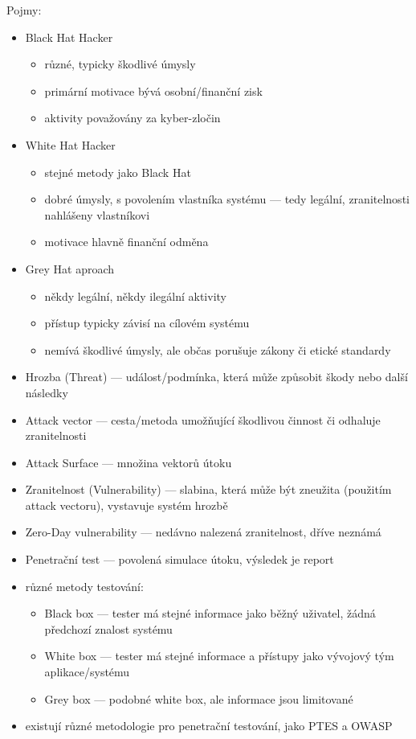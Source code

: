 Pojmy:
\begin{itemize}
	\item Black Hat Hacker
	\begin{itemize}
		\item různé, typicky škodlivé úmysly
		\item primární motivace bývá osobní/finanční zisk
		\item aktivity považovány za kyber-zločin
	\end{itemize}
	\item White Hat Hacker
	\begin{itemize}
		\item stejné metody jako Black Hat
		\item dobré úmysly, s povolením vlastníka systému --- tedy legální, zranitelnosti nahlášeny vlastníkovi
		\item motivace hlavně finanční odměna
	\end{itemize}
	\item Grey Hat aproach
	\begin{itemize}
		\item někdy legální, někdy ilegální aktivity
		\item přístup typicky závisí na cílovém systému
		\item nemívá škodlivé úmysly, ale občas porušuje zákony či etické standardy
	\end{itemize}
	\item Hrozba (Threat) --- událost/podmínka, která může způsobit škody nebo další následky
	\item Attack vector --- cesta/metoda umožňující škodlivou činnost či odhaluje zranitelnosti
	\item Attack Surface --- množina vektorů útoku
	\item Zranitelnost (Vulnerability) --- slabina, která může být zneužita (použitím attack vectoru), vystavuje systém hrozbě
	\item Zero-Day vulnerability --- nedávno nalezená zranitelnost, dříve neznámá
	\item Penetrační test --- povolená simulace útoku, výsledek je report
	\item různé metody testování:
	\begin{itemize}
		\item Black box --- tester má stejné informace jako běžný uživatel, žádná předchozí znalost systému
		\item White box --- tester má stejné informace a přístupy jako vývojový tým aplikace/systému
		\item Grey box --- podobné white box, ale informace jsou limitované
	\end{itemize}
	\item existují různé metodologie pro penetrační testování, jako PTES a OWASP
\end{itemize}

